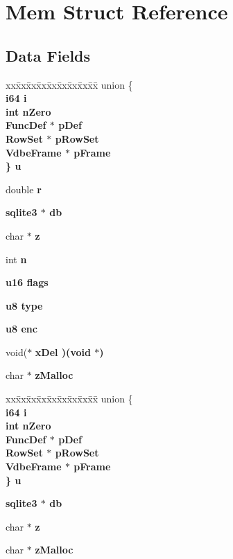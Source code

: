 \section{Mem Struct Reference}
\label{structMem}
\subsection*{Data Fields}
\begin{CompactItemize}
\item 
\begin{tabbing}
xx\=xx\=xx\=xx\=xx\=xx\=xx\=xx\=xx\=\kill
union \{\\
\>\bf{i64} \bf{i}\\
\>int \bf{nZero}\\
\>\bf{FuncDef} $\ast$ \bf{pDef}\\
\>\bf{RowSet} $\ast$ \bf{pRowSet}\\
\>\bf{VdbeFrame} $\ast$ \bf{pFrame}\\
\} \bf{u}\\

\end{tabbing}\item 
double \bf{r}
\item 
\bf{sqlite3} $\ast$ \bf{db}
\item 
char $\ast$ \bf{z}
\item 
int \bf{n}
\item 
\bf{u16} \bf{flags}
\item 
\bf{u8} \bf{type}
\item 
\bf{u8} \bf{enc}
\item 
void($\ast$ \bf{x\-Del} )(void $\ast$)
\item 
char $\ast$ \bf{z\-Malloc}
\item 
\begin{tabbing}
xx\=xx\=xx\=xx\=xx\=xx\=xx\=xx\=xx\=\kill
union \{\\
\>\bf{i64} \bf{i}\\
\>int \bf{nZero}\\
\>\bf{FuncDef} $\ast$ \bf{pDef}\\
\>\bf{RowSet} $\ast$ \bf{pRowSet}\\
\>\bf{VdbeFrame} $\ast$ \bf{pFrame}\\
\} \bf{u}\\

\end{tabbing}\item 
\bf{sqlite3} $\ast$ \bf{db}
\item 
char $\ast$ \bf{z}
\item 
char $\ast$ \bf{z\-Malloc}
\end{CompactItemize}



